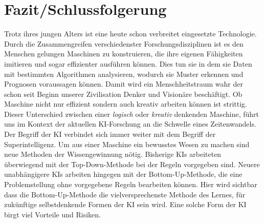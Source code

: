 \documentclass[12pt,german,ngerman]{report}
\begin{document}
%
%            

\chapter{Fazit/Schlussfolgerung}
    Trotz ihres jungen Alters ist  eine heute schon verbreitet eingesetzte Technologie.
    Durch die Zusammengreifen verschiedenster Forschungsdisziplinen ist es den Menschen gelungen
    Maschinen zu konstruieren, die ihre eigenen Fähigkeiten imitieren und sogar effizienter ausführen können.
    Dies tun sie in dem sie Daten mit bestimmten Algorithmen analysieren, wodurch sie Muster erkennen und Prognosen voraussagen können.
    Damit wird ein Menschheitstraum wahr der schon seit Beginn unserer Zivilisation Denker und Visionäre beschäftigt.
    Ob Maschine nicht nur effizient sondern auch kreativ arbeiten können ist strittig.
    Dieser Unterschied zwischen einer \emph{logisch} oder \emph{kreativ} denkenden Maschine,
    führt uns im Kontext der aktuellen KI-Forschung an die Schwelle eines Zeitenwandels.
    Der Begriff der KI verbindet sich immer weiter mit dem Begriff der Superintelligenz.
    Um aus einer Maschine ein bewusstes Wesen zu machen sind neue Methoden der Wissengewinnung nötig.
    Bisherige KIs arbeiteten überwiegend mit der Top-Down-Methode bei der Regeln vorgegeben sind.
    Neuere unabhängigere KIs arbeiten hingegen mit der Bottom-Up-Methode, die eine Problemstellung 
    ohne vorgegebene Regeln bearbeiten können.
    Hier wird sichtbar dass die Bottom-Up-Methode die vielversprechenste Methode des Lernes, für zukünftige selbstdenkende Formen
    der KI sein wird.
    Eine solche Form der KI birgt viel Vorteile und Risiken.
    
    
    
     



    \printbibliography[title={Quellenverzeichnis}]
\end{document}
